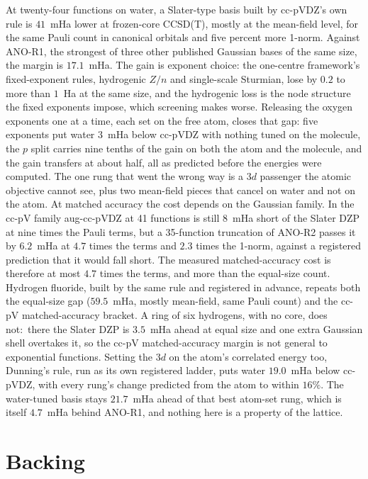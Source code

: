 \documentclass[aps,pra,twocolumn,superscriptaddress,longbibliography]{revtex4-2}
\newcommand{\gvc}[2]{#2}
\begin{document}
At twenty-four functions on water, a Slater-type basis built by
cc-pVDZ's own rule is $41$~mHa lower at frozen-core CCSD(T), mostly at
the mean-field level, for the same Pauli count in canonical orbitals and five percent more
1-norm.  Against ANO-R1, the strongest of three other published Gaussian
bases of the same size, the margin is $17.1$~mHa.  The gain is exponent choice: the one-centre framework's
fixed-exponent rules, hydrogenic $Z/n$ and single-scale Sturmian, lose
by $0.2$ to more than $1$~Ha at the same size, and the hydrogenic loss is
the node structure the fixed exponents impose, which screening makes
worse.  Releasing the oxygen exponents one at a time, each set on the
free atom, closes that gap: five exponents put water $3$~mHa below
cc-pVDZ with nothing tuned on the molecule, the $p$ split carries nine
tenths of the gain on both the atom and the molecule, and the gain
transfers at about half, all as predicted before the energies were
computed.  The one rung that went the wrong way is a $3d$ passenger the
atomic objective cannot see, plus two mean-field pieces that cancel on
water and not on the atom.  At matched accuracy the cost depends on the
Gaussian family.  In the cc-pV family aug-cc-pVDZ at 41 functions is
still $8$~mHa short of the Slater DZP at nine times the Pauli terms, but
a 35-function truncation of ANO-R2 passes it by $6.2$~mHa at $4.7$ times
the terms and $2.3$ times the 1-norm, against a registered prediction
that it would fall short.  The measured matched-accuracy cost is
therefore at most $4.7$ times the terms, and more than the equal-size
count.  Hydrogen fluoride, built by the same rule and registered in
advance, repeats both the equal-size gap ($59.5$~mHa, mostly mean-field,
same Pauli count) and the cc-pV matched-accuracy bracket.  A ring of six hydrogens, with no
core, does not:\ there the Slater DZP is $3.5$~mHa ahead at equal size and
one extra Gaussian shell overtakes it, so \gvc{p62-hring-contrast}{the cc-pV matched-accuracy margin is
not general to exponential functions}.  Setting the $3d$ on the atom's
correlated energy too, Dunning's rule, run as its own registered ladder,
puts water $19.0$~mHa below cc-pVDZ, with every rung's change predicted
from the atom to within $16\%$.  The water-tuned basis stays $21.7$~mHa
ahead of that best atom-set rung, which is itself $4.7$~mHa behind
ANO-R1, and nothing here is a property of the lattice.

\section*{Backing}
\end{document}

